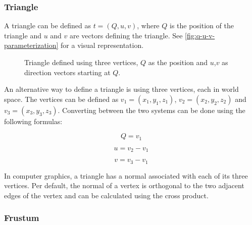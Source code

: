 \subsubsection{Triangle}

A triangle can be defined as $t = (Q, u, v)$, where $Q$ is the position of the triangle and $u$ and $v$ are vectors defining the triangle. See \autoref{fig:q-u-v-parameterization} for a visual representation.

\begin{figure}[H]
  \centering
  \caption{Triangle defined using three vertices, $Q$ as the position and $u$,$v$ as direction vectors starting at $Q$.}
  \label{fig:q-u-v-parameterization}
\end{figure}

An alternative way to define a triangle is using three vertices, each in world space. The vertices can be defined as $v_1 = (x_1, y_1, z_1)$, $v_2 = (x_2, y_2, z_2)$ and $v_3 = (x_3, y_3, z_3)$. Converting between the two systems can be done using the following formulas:

\begin{equation}
  \label{eqn:triangle-vertices-to-q-u-v}
  Q = v_1
\end{equation}

\begin{equation}
  \label{eqn:triangle-vertices-to-q-u-v1}
  u = v_2 - v_1
\end{equation}

\begin{equation}
  \label{eqn:triangle-vertices-to-q-u-v2}
  v = v_3 - v_1
\end{equation}

In computer graphics, a triangle has a normal associated with each of its three vertices. Per default, the normal of a vertex is orthogonal to the two adjacent edges of the vertex and can be calculated using the cross product.

\subsubsection{Frustum}

